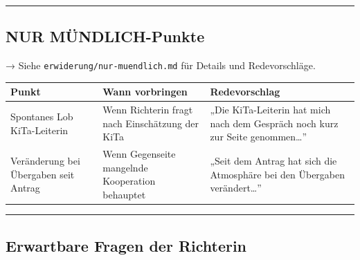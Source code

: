 \documentclass[
  11pt,
  a4paper,
]{article}
\newcounter{none}
\begin{document}
\begin{center}\rule{0.5\linewidth}{0.5pt}\end{center}

\subsection{NUR MÜNDLICH-Punkte}\label{nur-muxfcndlich-punkte}

→ Siehe \texttt{erwiderung/nur-muendlich.md} für Details und
Redevorschläge.

{\def\LTcaptype{none} %
\begin{longtable}[]{@{}
  >{\raggedright\arraybackslash}p{}
  >{\raggedright\arraybackslash}p{}
  >{\raggedright\arraybackslash}p{}@{}}
\toprule\noalign{}
\begin{minipage}[b]{\linewidth}\raggedright
Punkt
\end{minipage} & \begin{minipage}[b]{\linewidth}\raggedright
Wann vorbringen
\end{minipage} & \begin{minipage}[b]{\linewidth}\raggedright
Redevorschlag
\end{minipage} \\
\midrule\noalign{}
\endhead
\bottomrule\noalign{}
\endlastfoot
Spontanes Lob KiTa-Leiterin & Wenn Richterin fragt nach Einschätzung der
KiTa & „Die KiTa-Leiterin hat mich nach dem Gespräch noch kurz zur Seite
genommen\ldots'' \\
Veränderung bei Übergaben seit Antrag & Wenn Gegenseite mangelnde
Kooperation behauptet & „Seit dem Antrag hat sich die Atmosphäre bei den
Übergaben verändert\ldots'' \\
\end{longtable}
}

\begin{center}\rule{0.5\linewidth}{0.5pt}\end{center}

\subsection{Erwartbare Fragen der
Richterin}\label{erwartbare-fragen-der-richterin}
\end{document}
